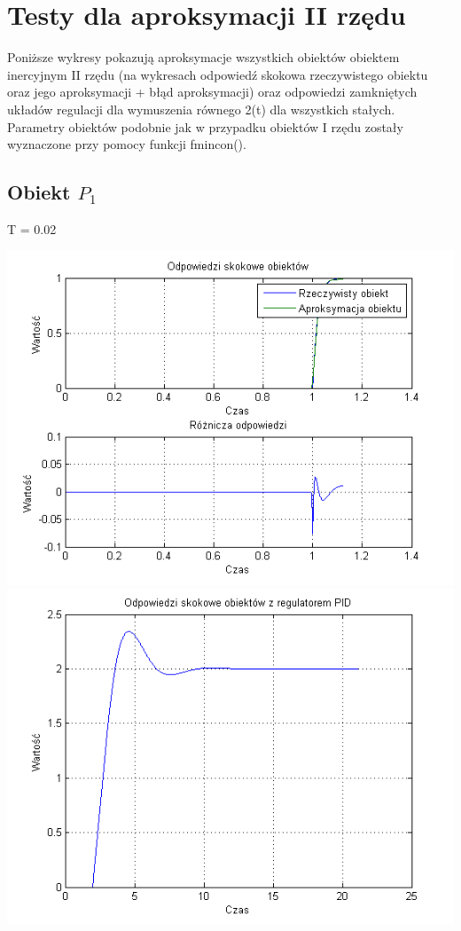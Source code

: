 \documentclass[10pt,a4paper]{article}
\begin{document}
\section{Testy dla aproksymacji II rzędu}
Poniższe wykresy pokazują aproksymacje wszystkich obiektów obiektem inercyjnym II rzędu (na wykresach odpowiedź skokowa rzeczywistego obiektu oraz jego aproksymacji + błąd aproksymacji) oraz odpowiedzi zamkniętych układów regulacji dla wymuszenia równego 2(t) dla wszystkich stałych.\\
Parametry obiektów podobnie jak w przypadku obiektów I rzędu zostały wyznaczone przy pomocy funkcji fmincon().
\newpage
\subsection{Obiekt $P_1$}
T = 0.02
\begin{center}
\includegraphics[scale=1]{images/dwa/skrypt_01.png}\\
\includegraphics[scale=1]{images/dwa/skrypt_02.png}\\
\end{center}
\end{document}
